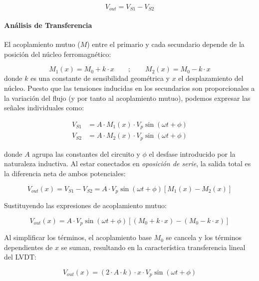 \begin{equation}\label{eq:v_out_lvdt}
    V_{out} = V_{S1} - V_{S2}
\end{equation}

\paragraph{Análisis de Transferencia}

El acoplamiento mutuo ($M$) entre el primario y cada secundario depende de la posición del núcleo ferromagnético:

\begin{equation}
    M_1(x) = M_0 + k \cdot x \qquad ; \qquad M_2(x) = M_0 - k \cdot x
\end{equation}
%
donde $k$ es una constante de sensibilidad geométrica y $x$ el desplazamiento del núcleo. Puesto que las tensiones inducidas en los secundarios son proporcionales a la variación del flujo (y por tanto al acoplamiento mutuo), podemos expresar las señales individuales como:

\begin{align}
    V_{S1} &= A \cdot M_1(x) \cdot V_p \sin(\omega t + \phi) \\
    V_{S2} &= A \cdot M_2(x) \cdot V_p \sin(\omega t + \phi)
\end{align}

donde $A$ agrupa las constantes del circuito y $\phi$ el desfase introducido por la naturaleza inductiva. Al estar conectados en \emph{oposición de serie}, la salida total es la diferencia neta de ambos potenciales:

\begin{equation}
    V_{out}(x) = V_{S1} - V_{S2} = A \cdot V_p \sin(\omega t + \phi) \left[ M_1(x) - M_2(x) \right]
\end{equation}

Sustituyendo las expresiones de acoplamiento mutuo:

\begin{equation}
    V_{out}(x) = A \cdot V_p \sin(\omega t + \phi) \left[ (M_0 + k \cdot x) - (M_0 - k \cdot x) \right]
\end{equation}

Al simplificar los términos, el acoplamiento base $M_0$ se cancela y los términos dependientes de $x$ se suman, resultando en la característica transferencia lineal del LVDT:

\begin{equation}\label{eq:lvdt_lineal}
    V_{out}(x) = (2 \cdot A \cdot k) \cdot x \cdot V_p \sin(\omega t + \phi)
\end{equation}

